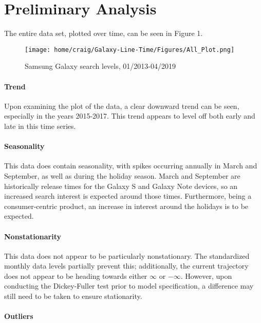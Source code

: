 \documentclass[12pt]{article}
\begin{document}
	\section{Preliminary Analysis}
	
	The entire data set, plotted over time, can be seen in Figure 1.
	
\begin{figure}
		\texttt{[image: home/craig/Galaxy-Line-Time/Figures/All\_Plot.png]}
		\caption{Samsung Galaxy search levels, 01/2013-04/2019}
\end{figure}

	
\paragraph{Trend}

	Upon examining the plot of the data, a clear downward trend can be seen, especially in the years 2015-2017.  This trend appears to level off both early and late in this time series.

\paragraph{Seasonality}

	This data does contain seasonality, with spikes occurring annually in March and September, as well as during the holiday season.  March and September are historically release times for the Galaxy S and Galaxy Note devices, so an increased search interest is expected around those times.  Furthermore, being a consumer-centric product, an increase in interest around the holidays is to be expected.

\paragraph{Nonstationarity}
	
	This data does not appear to be particularly nonstationary.  The standardized monthly data levels partially prevent this; additionally, the current trajectory does not appear to be heading towards either $ \infty $ or $ -\infty $.  However, upon conducting the Dickey-Fuller test prior to model specification, a difference may still need to be taken to ensure stationarity.
	

\paragraph{Outliers}
\end{document}
